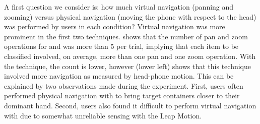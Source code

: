 A first question we consider is: how much virtual navigation (panning and zooming) versus physical navigation (moving the phone with respect to the head) was performed by users in each condition?
Virtual navigation was more prominent in the first two techniques.  shows that the number of pan and zoom operations for  and  was more than 5 per trial, implying that each item to be classified involved, on average, more than one pan and one zoom operation. With the  technique, the count is lower, however  (lower left) shows that this technique involved more  navigation as measured by head-phone motion. This can be explained by two observations made during the experiment. First, users often performed physical navigation with  to bring target containers closer to their dominant hand. Second, users also found it difficult to perform virtual navigation with  due to somewhat unreliable sensing with the Leap Motion. 

